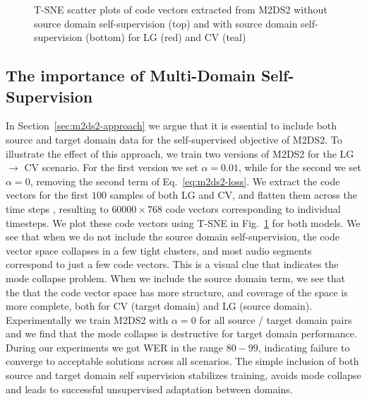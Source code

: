 \documentclass[journal]{IEEEtran}
\begin{document}


\begin{figure}[ht]
\centering
{}\quad
{}
\caption{T-SNE scatter plots of code vectors extracted from M2DS2 without source domain self-supervision (top) and with source domain self-supervision (bottom) for LG (red) and CV (teal)}
\label{fig:tsne}
\end{figure}

\subsection{The importance of Multi-Domain Self-Supervision}
\label{sec:multi-domain}

In Section~\ref{sec:m2ds2-approach} we argue that it is essential to include both source and target domain data for the self-supervised objective of M2DS2. To illustrate the effect of this approach, we train two versions of M2DS2 for the LG $\rightarrow$ CV scenario. For the first version we set $\alpha=0.01$, while for the second we set $\alpha=0$, removing the second term of Eq.~\eqref{eq:m2ds2-loss}. We extract the code vectors for the first $100$ samples of both LG and CV, and flatten them across the time steps , resulting to $60000 \times 768$ code vectors corresponding to individual timesteps. We plot these code vectors using T-SNE \cite{van2008visualizing} in Fig.~\ref{fig:tsne} for both models. We see that when we do not include the source domain self-supervision, the code vector space collapses in a few tight clusters, and most audio segments correspond to just a few code vectors. This is a visual clue that indicates the mode collapse problem. When we include the source domain term, we see that the that the code vector space has more structure, and coverage of the space is more complete, both for CV (target domain) and LG (source domain). Experimentally we train M2DS2 with $\alpha=0$ for all source / target domain pairs and we find that the mode collapse is destructive for target domain performance. During our experiments we got WER in the range $80 - 99$, indicating failure to converge to acceptable solutions across all scenarios. The simple inclusion of both source and target domain self supervision stabilizes training, avoids mode collapse and leads to successful unsupervised adaptation between domains.
\end{document}
